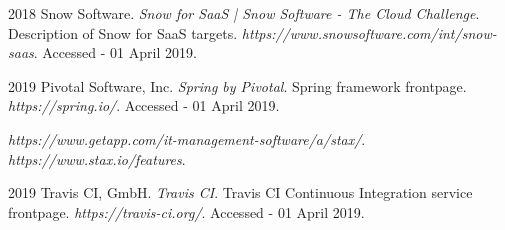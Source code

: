 \documentclass[licencjacka,en]{thesisclass}
\begin{document}
\begin{thebibliography}{99}
        2018 Snow Software.
        \textit{Snow for SaaS | Snow Software - The Cloud Challenge}.
        Description of Snow for SaaS targets.
        \textit{https://www.snowsoftware.com/int/snow-saas}.
        Accessed - 01 April 2019.

        2019 Pivotal Software, Inc.
        \textit{Spring by Pivotal}.
        Spring framework frontpage.
        \textit{https://spring.io/}.
        Accessed - 01 April 2019.

        \textit{https://www.getapp.com/it-management-software/a/stax/}.
        \textit{https://www.stax.io/features}.

        2019 Travis CI, GmbH.
        \textit{Travis CI}.
        Travis CI Continuous Integration service frontpage.
        \textit{https://travis-ci.org/}.
        Accessed - 01 April 2019.

    \end{thebibliography}
\end{document}
